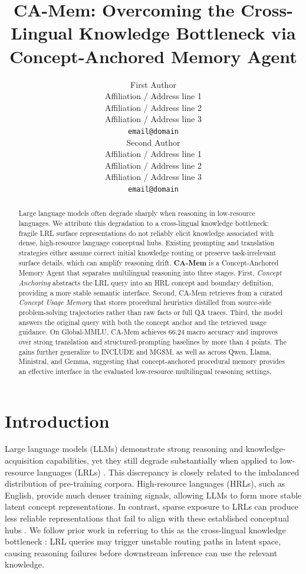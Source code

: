 \documentclass[11pt]{article}
\title{CA-Mem: Overcoming the Cross-Lingual Knowledge Bottleneck via Concept-Anchored Memory Agent}
\author{First Author \\
  Affiliation / Address line 1 \\
  Affiliation / Address line 2 \\
  Affiliation / Address line 3 \\
  \texttt{email@domain} \\\And
  Second Author \\
  Affiliation / Address line 1 \\
  Affiliation / Address line 2 \\
  Affiliation / Address line 3 \\
  \texttt{email@domain} \\}
\begin{document}
\maketitle
\begin{abstract}
Large language models often degrade sharply when reasoning in low-resource languages.
We attribute this degradation to a cross-lingual knowledge bottleneck: fragile LRL surface representations do not reliably elicit knowledge associated with dense, high-resource language conceptual hubs.
Existing prompting and translation strategies either assume correct initial knowledge routing or preserve task-irrelevant surface details, which can amplify reasoning drift.
\textbf{CA-Mem} is a Concept-Anchored Memory Agent that separates multilingual reasoning into three stages.
First, \textit{Concept Anchoring} abstracts the LRL query into an HRL concept and boundary definition, providing a more stable semantic interface.
Second, CA-Mem retrieves from a curated \textit{Concept Usage Memory} that stores procedural heuristics distilled from source-side problem-solving trajectories rather than raw facts or full QA traces.
Third, the model answers the original query with both the concept anchor and the retrieved usage guidance.
On Global-MMLU, CA-Mem achieves 66.24 macro accuracy and improves over strong translation and structured-prompting baselines by more than 4 points. The gains further generalize to INCLUDE and MGSM, as well as across Qwen, Llama, Ministral, and Gemma, suggesting that concept-anchored procedural memory provides an effective interface in the evaluated low-resource multilingual reasoning settings.
\end{abstract}

\section{Introduction}

Large language models (LLMs) demonstrate strong reasoning and knowledge-acquisition capabilities, yet they still degrade substantially when applied to low-resource languages (LRLs) \citep{qin2024does,zhang2025survey}.
This discrepancy is closely related to the imbalanced distribution of pre-training corpora.
High-resource languages (HRLs), such as English, provide much denser training signals, allowing LLMs to form more stable latent concept representations.
In contrast, sparse exposure to LRLs can produce less reliable representations that fail to align with these established conceptual hubs \citep{zhu2024multilingual,cao2024exploring}.
We follow prior work in referring to this as the cross-lingual knowledge bottleneck \citep{goworek2025bridging}: LRL queries may trigger unstable routing paths in latent space, causing reasoning failures before downstream inference can use the relevant knowledge.
\end{document}
